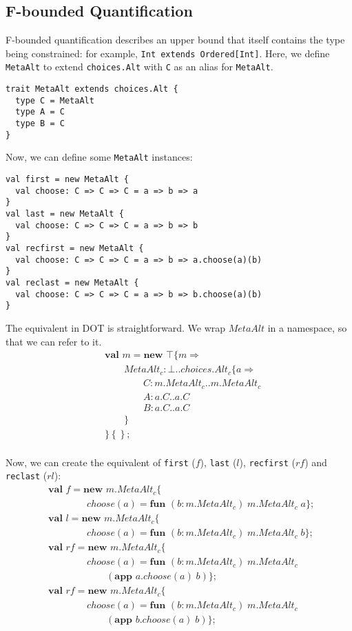 \documentclass[9pt]{sigplanconf}
\def\code{\lstinline}  % shorter version so you can write \code|String[Foo]|
\newcommand{\mi}[1]{\mathit{#1}}
\newcommand{\gap}{\quad\quad}
\newcommand{\mlrefine}[2]{\{#1 \Rightarrow #2 \}}
\newcommand{\ldefs}[1]{\left\{#1\right\}}
\newcommand{\mlldefs}[1]{\{#1\}}
\newcommand{\mlnew}[3]{\textbf{val }#1 = \textbf{new }#2 ;\;\\&#3}
\newcommand{\Ldecl}[3]{#1 : #2..#3}%
\newcommand{\Top}{\top}%
\newcommand{\Bot}{\bot}%
\newcommand{\fun}[4]{\textbf{fun } (#1:#2)\;#3\;#4}
\newcommand{\app}[2]{(\textbf{app }#1\;#2)}
\begin{document}
\subsection{F-bounded Quantification}

F-bounded quantification describes an upper bound that itself contains
the type being constrained: for example, \code{Int extends Ordered[Int]}.
Here, we define \code{MetaAlt} to extend
\code{choices.Alt} with \code{C} as an alias for \code{MetaAlt}.

\begin{lstlisting}
trait MetaAlt extends choices.Alt {
  type C = MetaAlt
  type A = C
  type B = C
}
\end{lstlisting}

Now, we can define some \code{MetaAlt} instances:
\begin{lstlisting}
val first = new MetaAlt {
  val choose: C => C => C = a => b => a
}
val last = new MetaAlt {
  val choose: C => C => C = a => b => b
}
val recfirst = new MetaAlt {
  val choose: C => C => C = a => b => a.choose(a)(b)
}
val reclast = new MetaAlt {
  val choose: C => C => C = a => b => b.choose(a)(b)
}
\end{lstlisting}

The equivalent in DOT is straightforward. We wrap $\mi{MetaAlt}$ in a
namespace, so that we can refer to it.
\begin{align*}
&\mlnew m {\Top \mlrefine m {\\
&\gap\Ldecl {\mi{MetaAlt_c}} {\Bot} {{\mi{choices.Alt_c}} \mlrefine a {\\
&\gap\gap\Ldecl C {\mi{m.MetaAlt_c}} {\mi{m.MetaAlt_c}}\\
&\gap\gap\Ldecl A {\mi{a.C}} {\mi{a.C}}\\
&\gap\gap\Ldecl B {\mi{a.C}} {\mi{a.C}}\\
&\gap}}\\
&}\ldefs{}}{}
\end{align*}

Now, we can create the equivalent of \code{first} ($f$), \code{last}
($l$), \code{recfirst} ($\mi{rf}$) and \code{reclast} ($\mi{rl}$):
\begin{align*}
&\mlnew f {{\mi{m.MetaAlt_c}}\mlldefs{\\
&\gap\gap\mi{choose}(a)=\fun b {\mi{m.MetaAlt_c}} {\mi{m.MetaAlt_c}} a}}{
\mlnew l {{\mi{m.MetaAlt_c}}\mlldefs{\\
&\gap\gap\mi{choose}(a)=\fun b {\mi{m.MetaAlt_c}} {\mi{m.MetaAlt_c}} b}}{
\mlnew {\mi{rf}} {{\mi{m.MetaAlt_c}}\mlldefs{\\
&\gap\gap\mi{choose}(a)=\fun b {\mi{m.MetaAlt_c}} {\mi{m.MetaAlt_c}} {\\
&\gap\gap\gap \app {{\mi{a.choose}}(a)} b}}}{
\mlnew {\mi{rf}} {{\mi{m.MetaAlt_c}}\mlldefs{\\
&\gap\gap\mi{choose}(a)=\fun b {\mi{m.MetaAlt_c}} {\mi{m.MetaAlt_c}} {\\
&\gap\gap\gap \app {{\mi{b.choose}}(a)} b}}}{
}}}}
\end{align*}
\end{document}
